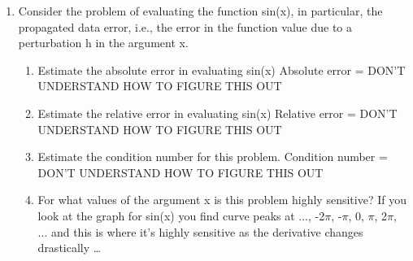 \documentclass[12pt,a4paper,oneside,draft]{article}
\begin{document}
\begin{enumerate}
     \item Consider the problem of evaluating the function sin(x), in particular, the propagated data
error, i.e., the error in the function value due to a perturbation h in the argument x.
	\begin{enumerate}
    	\item Estimate the absolute error in evaluating sin(x)
    	\newline
    	\textcolor[rgb]{1,.5,0}{Absolute error = DON'T UNDERSTAND HOW TO FIGURE THIS OUT}
    	\item Estimate the relative error in evaluating sin(x)
    	\newline
    	\textcolor[rgb]{1,.5,0}{Relative error = DON'T UNDERSTAND HOW TO FIGURE THIS OUT}
     	\item Estimate the condition number for this problem.
    	\newline
    	\textcolor[rgb]{1,.5,0}{Condition number = DON'T UNDERSTAND HOW TO FIGURE THIS OUT}
     	\item For what values of the argument x is this problem highly sensitive?
    	\newline
    	\textcolor[rgb]{1,.5,0}{If you look at the graph for sin(x) you find curve peaks at ..., -2$\pi$, -$\pi$, 0, $\pi$, 2$\pi$, ... and this is where it's highly sensitive as the derivative changes drastically }\ldots
     \end{enumerate}
\end{enumerate}
\end{document}
